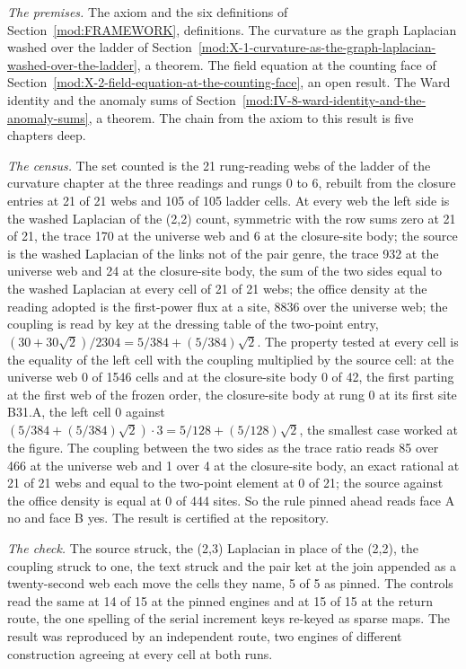 \begin{chproof}
\textit{The premises.} The axiom and the six definitions of Section~\ref{mod:FRAMEWORK}, definitions. The curvature as the graph Laplacian washed over the ladder of Section~\ref{mod:X-1-curvature-as-the-graph-laplacian-washed-over-the-ladder}, a theorem. The field equation at the counting face of Section~\ref{mod:X-2-field-equation-at-the-counting-face}, an open result. The Ward identity and the anomaly sums of Section~\ref{mod:IV-8-ward-identity-and-the-anomaly-sums}, a theorem. The chain from the axiom to this result is five chapters deep.

\textit{The census.} The set counted is the 21 rung-reading webs of the ladder of the curvature chapter at the three readings and rungs 0 to 6, rebuilt from the closure entries at 21 of 21 webs and 105 of 105 ladder cells. At every web the left side is the washed Laplacian of the (2,2) count, symmetric with the row sums zero at 21 of 21, the trace 170 at the universe web and 6 at the closure-site body; the source is the washed Laplacian of the links not of the pair genre, the trace 932 at the universe web and 24 at the closure-site body, the sum of the two sides equal to the washed Laplacian at every cell of 21 of 21 webs; the office density at the reading adopted is the first-power flux at a site, 8836 over the universe web; the coupling is read by key at the dressing table of the two-point entry, $(30 + 30\sqrt{2})/2304 = 5/384 + (5/384)\sqrt{2}$. The property tested at every cell is the equality of the left cell with the coupling multiplied by the source cell: at the universe web 0 of 1546 cells and at the closure-site body 0 of 42, the first parting at the first web of the frozen order, the closure-site body at rung 0 at its first site B31.A, the left cell 0 against $(5/384 + (5/384)\sqrt{2})\cdot 3 = 5/128 + (5/128)\sqrt{2}$, the smallest case worked at the figure. The coupling between the two sides as the trace ratio reads 85 over 466 at the universe web and 1 over 4 at the closure-site body, an exact rational at 21 of 21 webs and equal to the two-point element at 0 of 21; the source against the office density is equal at 0 of 444 sites. So the rule pinned ahead reads face A no and face B yes. The result is certified at the repository.

\textit{The check.} The source struck, the (2,3) Laplacian in place of the (2,2), the coupling struck to one, the text struck and the pair ket at the join appended as a twenty-second web each move the cells they name, 5 of 5 as pinned. The controls read the same at 14 of 15 at the pinned engines and at 15 of 15 at the return route, the one spelling of the serial increment keys re-keyed as sparse maps. The result was reproduced by an independent route, two engines of different construction agreeing at every cell at both runs.
\end{chproof}
